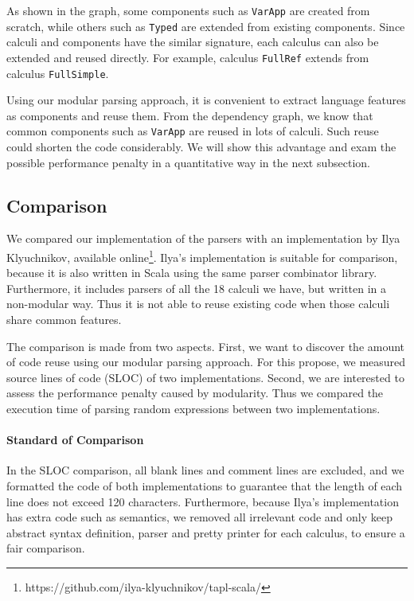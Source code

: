 As shown in the graph, some components such as \lstinline{VarApp} are
created from scratch, while others such as \lstinline{Typed} are
extended from existing components. Since calculi and components have the similar signature, each calculus
can also be extended and reused directly. For example, calculus \lstinline{FullRef} extends from
calculus \lstinline{FullSimple}.

Using our modular parsing approach, it is convenient to extract language
features as components and reuse them. From the dependency graph, we know
that common components such as \lstinline{VarApp} are reused in
lots of calculi. Such reuse could shorten the code considerably. We
will show this advantage and exam the possible performance penalty in
a quantitative way in the next subsection.

\subsection{Comparison}\label{subsec:cs-comparison}

We compared our implementation of the parsers with an implementation
by Ilya Klyuchnikov, available online\footnote{https://github.com/ilya-klyuchnikov/tapl-scala/}.
Ilya's implementation is suitable for comparison, because it is also
written in Scala using the same parser combinator library.
Furthermore, it includes parsers of all the 18 calculi we have, but
written in a non-modular way. Thus it is not able to reuse existing
code when those calculi share common features.

The comparison is made from two aspects. First, we want to discover
the amount of code reuse using our modular parsing approach.
For this propose, we measured source lines of code (SLOC) of two implementations.
Second, we are interested to assess the performance penalty caused by modularity.
Thus we compared the execution time of parsing random expressions between two implementations.

\paragraph{Standard of Comparison}
In the SLOC comparison, all blank lines and comment lines are excluded,
and we formatted the code of both implementations to guarantee that
the length of each line does not exceed 120 characters. Furthermore,
because Ilya's implementation has extra code such as semantics,
we removed all irrelevant code and only keep abstract
syntax definition, parser and pretty printer for each calculus, to
ensure a fair comparison.

